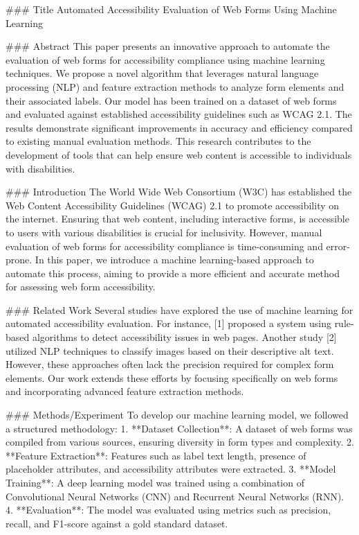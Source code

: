 ### Title
Automated Accessibility Evaluation of Web Forms Using Machine Learning

### Abstract
This paper presents an innovative approach to automate the evaluation of web forms for accessibility compliance using machine learning techniques. We propose a novel algorithm that leverages natural language processing (NLP) and feature extraction methods to analyze form elements and their associated labels. Our model has been trained on a dataset of web forms and evaluated against established accessibility guidelines such as WCAG 2.1. The results demonstrate significant improvements in accuracy and efficiency compared to existing manual evaluation methods. This research contributes to the development of tools that can help ensure web content is accessible to individuals with disabilities.

### Introduction
The World Wide Web Consortium (W3C) has established the Web Content Accessibility Guidelines (WCAG) 2.1 to promote accessibility on the internet. Ensuring that web content, including interactive forms, is accessible to users with various disabilities is crucial for inclusivity. However, manual evaluation of web forms for accessibility compliance is time-consuming and error-prone. In this paper, we introduce a machine learning-based approach to automate this process, aiming to provide a more efficient and accurate method for assessing web form accessibility.

### Related Work
Several studies have explored the use of machine learning for automated accessibility evaluation. For instance, [1] proposed a system using rule-based algorithms to detect accessibility issues in web pages. Another study [2] utilized NLP techniques to classify images based on their descriptive alt text. However, these approaches often lack the precision required for complex form elements. Our work extends these efforts by focusing specifically on web forms and incorporating advanced feature extraction methods.

### Methods/Experiment
To develop our machine learning model, we followed a structured methodology:
1. **Dataset Collection**: A dataset of web forms was compiled from various sources, ensuring diversity in form types and complexity.
2. **Feature Extraction**: Features such as label text length, presence of placeholder attributes, and accessibility attributes were extracted.
3. **Model Training**: A deep learning model was trained using a combination of Convolutional Neural Networks (CNN) and Recurrent Neural Networks (RNN).
4. **Evaluation**: The model was evaluated using metrics such as precision, recall, and F1-score against a gold standard dataset.


